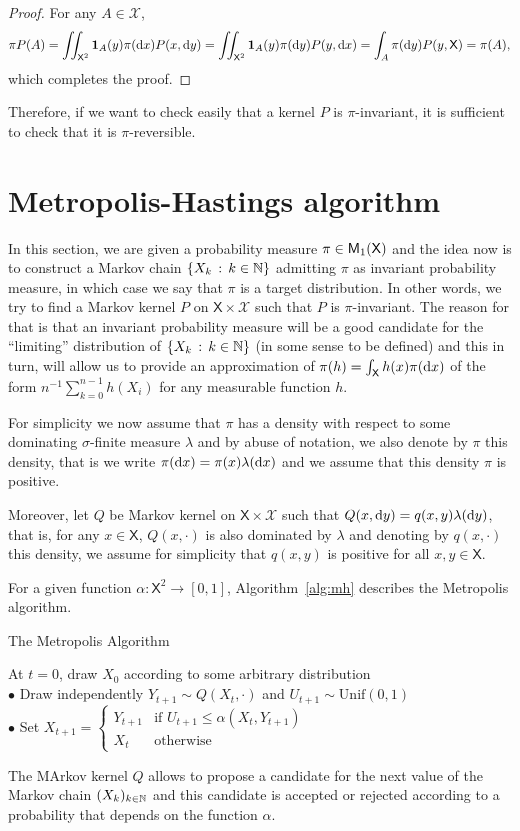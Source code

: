 \documentclass[english,graybox,envcountchap,envcountsame,sectrefs,shortlabels]{svmono}
\theoremstyle{style}
\newcommand{\Xset}{\mathsf{X}}
\newcommand{\Xsigma}{\mathcal{X}}
\begin{document}
\begin{proof}
For any $A\in\Xsigma$, 
\[
\pi P(A)=\iint_{\Xset^{2}}\indi A(y)\pi(\rmd x)P(x,\rmd y)=\iint_{\Xset^{2}}\indi A(y)\pi(\rmd y)P(y,\rmd x)=\int_{A}\pi(\rmd y)P(y,\Xset)=\pi(A),
\]
which completes the proof.
\end{proof}
Therefore, if we want to check easily that
a kernel $P$ is $\pi$-invariant, it is sufficient to check that
it is $\pi$-reversible.


\section{Metropolis-Hastings algorithm}
In this section, we are given a probability measure $\pi\in\meas 1(\Xset)$
and the idea now is to construct a Markov chain $\left\{ X_{k}\,:\,k\in\mathbb{N}\right\}$
admitting $\pi$ as invariant probability measure, in which case we
say that $\pi$ is a target distribution. In other words, we try to
find a Markov kernel $P$ on $\Xset\times\Xsigma$ such that $P$
is $\pi$-invariant. The reason for that is that an invariant probability
measure will be a good candidate for the ``limiting'' distribution
of $\left\{ X_{k}\,:\,k\in\mathbb{N}\right\}$ (in some sense to be defined) and this
in turn, will allow us to provide an approximation of $\pi(h)=\int_{\Xset}h(x)\pi(\rmd x)$ of the form $n^{-1}\sum_{k=0}^{n-1}h(X_{i})$ for any measurable function $h$. 


For simplicity we now assume that $\pi$ has a density with respect
to some dominating $\sigma$-finite measure $\lambda$ and by abuse
of notation, we also denote by $\pi$ this density, that is we write
$\pi(\mathrm{d} x)=\pi(x)\lambda(\mathrm{d} x)$ and we assume that this density
$\pi$ is positive.

Moreover, let $Q$ be Markov kernel on $\Xset\times\Xsigma$ such
that $Q(x,\mathrm{d} y)=q(x,y)\lambda(\mathrm{d} y)$, that is, for any $x\in\Xset$,
$Q(x,\cdot)$ is also dominated by $\lambda$ and denoting by $q(x,\cdot)$
this density, we assume for simplicity that $q(x,y)$ is positive
for all $x,y\in\Xset$. 

For a given function $\alpha:\Xset^{2}\to[0,1]$,  Algorithm~\ref{alg:mh} describes the Metropolis algorithm.

\begin{algorithm}
\caption{\label{alg:mh}The Metropolis Algorithm}
{}
\BlankLine
At $t=0$, draw $X_{0}$ according to some arbitrary distribution\\
{
$\bullet$ Draw independently $Y_{t+1}\sim Q(X_{t},\cdot)$ and $U_{t+1}\sim\mathrm{Unif}(0,1)$\\
$\bullet$ Set $X_{t+1}=\begin{cases} Y_{t+1} & \mbox{if }U_{t+1}\leq\alpha(X_{t},Y_{t+1})\\ X_{t} & \mbox{otherwise} \end{cases}$
}
\end{algorithm}
The MArkov kernel $Q$ allows to propose a candidate for the next value of
the Markov chain $(X_{k})_{k\in\mathbb{N}}$ and this candidate is accepted or
rejected according to a probability that depends on the function $\alpha$.
\end{document}
